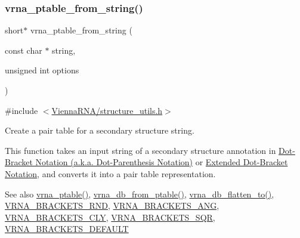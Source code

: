 \subsubsection{\texorpdfstring{vrna\+\_\+ptable\+\_\+from\+\_\+string()}{vrna\_ptable\_from\_string()}}
{\footnotesize\ttfamily short$\ast$ vrna\+\_\+ptable\+\_\+from\+\_\+string (\begin{DoxyParamCaption}\item[{const char $\ast$}]{string,  }\item[{unsigned int}]{options }\end{DoxyParamCaption})}



{\ttfamily \#include $<$\hyperlink{structure__utils_8h}{Vienna\+R\+N\+A/structure\+\_\+utils.\+h}$>$}



Create a pair table for a secondary structure string. 

This function takes an input string of a secondary structure annotation in \hyperlink{rna_structure_notations_dot-bracket-notation}{Dot-\/\+Bracket Notation (a.\+k.\+a. Dot-\/\+Parenthesis Notation)} or \hyperlink{rna_structure_notations_dot-bracket-ext-notation}{Extended Dot-\/\+Bracket Notation}, and converts it into a pair table representation.

\begin{DoxySeeAlso}{See also}
\hyperlink{group__struct__utils_gae829fb8bb7f694c12a9c0bbc34c77c60}{vrna\+\_\+ptable()}, \hyperlink{group__struct__utils_gaf9ecd0d7877fecdbb0292e24f40283d5}{vrna\+\_\+db\+\_\+from\+\_\+ptable()}, \hyperlink{group__struct__utils_ga690425199c8b71545e7196e3af1436f8}{vrna\+\_\+db\+\_\+flatten\+\_\+to()}, \hyperlink{group__struct__utils_gac92d5fa7c6625bce2670ece510a24fbd}{V\+R\+N\+A\+\_\+\+B\+R\+A\+C\+K\+E\+T\+S\+\_\+\+R\+ND}, \hyperlink{group__struct__utils_ga863e03f7f73f10fc9bbcbefbdda4bec8}{V\+R\+N\+A\+\_\+\+B\+R\+A\+C\+K\+E\+T\+S\+\_\+\+A\+NG}, \hyperlink{group__struct__utils_gaf41be40e79cb756c4e0bb8edb4d803d2}{V\+R\+N\+A\+\_\+\+B\+R\+A\+C\+K\+E\+T\+S\+\_\+\+C\+LY}, \hyperlink{group__struct__utils_ga60525d61d7496eeea490a37f3d6bf757}{V\+R\+N\+A\+\_\+\+B\+R\+A\+C\+K\+E\+T\+S\+\_\+\+S\+QR}, \hyperlink{group__struct__utils_ga559ebf76b1b289f85309f4206e99aa1a}{V\+R\+N\+A\+\_\+\+B\+R\+A\+C\+K\+E\+T\+S\+\_\+\+D\+E\+F\+A\+U\+LT}
\end{DoxySeeAlso}

